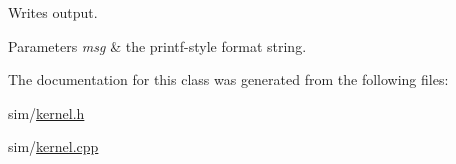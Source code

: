Writes output. 


\begin{DoxyParams}{Parameters}
{\em msg} & the printf-\/style format string. \\
\hline
\end{DoxyParams}


The documentation for this class was generated from the following files\+:\begin{DoxyCompactItemize}
\item 
sim/\hyperlink{kernel_8h}{kernel.\+h}\item 
sim/\hyperlink{kernel_8cpp}{kernel.\+cpp}\end{DoxyCompactItemize}
